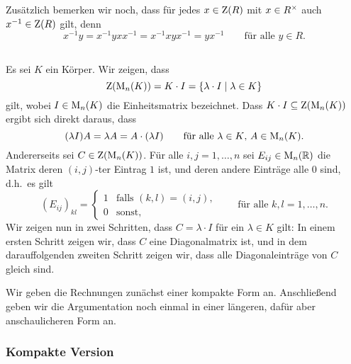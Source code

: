 Zusätzlich bemerken wir noch, dass für jedes $x \in \operatorname{Z}(R)$ mit $x \in {R}^\times$ auch $x^{-1} \in \operatorname{Z}(R)$ gilt, denn
\[
    x^{-1} y
  = x^{-1} y x x^{-1}
  = x^{-1} x y x^{-1}
  = y x^{-1}
  \qquad
  \text{für alle $y \in R$}.
\]





\subsection{}
Es sei $K$ ein Körper.
Wir zeigen, dass
\[
    \operatorname{Z}(\operatorname{M}_{n}(K))
  = K \cdot I
  = \{\lambda \cdot I \mid \lambda \in K\}
\]
gilt, wobei $I \in \operatorname{M}_{n}(K)$ die Einheitsmatrix bezeichnet.
Dass $K \cdot I \subseteq \operatorname{Z}(\operatorname{M}_{n}(K))$ ergibt sich direkt daraus, dass
\[
    (\lambda I) A
  = \lambda A
  = A \cdot (\lambda I)
  \qquad
  \text{für alle $\lambda \in K$, $A \in \operatorname{M}_{n}(K)$}.
\]
Andererseits sei $C \in \operatorname{Z}(\operatorname{M}_{n}(K))$.
Für alle $i,j = 1, \dotsc, n$ sei $E_{ij} \in \operatorname{M}_{n}(\mathbb{R})$ die Matrix deren $(i,j)$-ter Eintrag $1$ ist, und deren andere Einträge alle $0$ sind, d.h.\ es gilt
\[
    (E_{ij})_{kl}
  = \begin{cases}
      1 & \text{falls $(k,l) = (i,j)$}, \\
      0 & \text{sonst},
    \end{cases}
    \qquad
    \text{für alle $k,l = 1, \dotsc, n$}.
\]
Wir zeigen nun in zwei Schritten, dass $C = \lambda \cdot I$ für ein $\lambda \in K$ gilt:
In einem ersten Schritt zeigen wir, dass $C$ eine Diagonalmatrix ist, und in dem darauffolgenden zweiten Schritt zeigen wir, dass alle Diagonaleinträge von $C$ gleich sind.

Wir geben die Rechnungen zunächst einer kompakte Form an.
Anschließend geben wir die Argumentation noch einmal in einer längeren, dafür aber anschaulicheren Form an.



\subsubsection{Kompakte Version}


